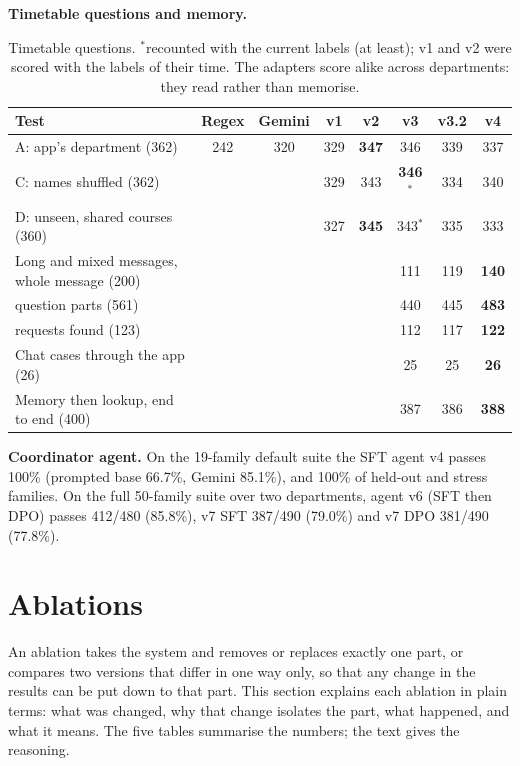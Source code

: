 \documentclass[11pt,a4paper]{article}
\newcommand{\best}[1]{\textbf{#1}}
\begin{document}
\textbf{Timetable questions and memory.}

\begin{table}[H]
\centering\small
\begin{tabularx}{\textwidth}{@{}Y c c c c c c c@{}}
\toprule
\textbf{Test} & \textbf{Regex} & \textbf{Gemini} & \textbf{v1} & \textbf{v2} & \textbf{v3} & \textbf{v3.2} & \textbf{v4}\\
\midrule
A: app's department (362) & 242 & 320 & 329 & \best{347} & 346 & 339 & 337\\
C: names shuffled (362) & & & 329 & 343 & \best{346}$^*$ & 334 & 340\\
D: unseen, shared courses (360) & & & 327 & \best{345} & 343$^*$ & 335 & 333\\
Long and mixed messages, whole message (200) & & & & & 111 & 119 & \best{140}\\
\quad question parts (561) & & & & & 440 & 445 & \best{483}\\
\quad requests found (123) & & & & & 112 & 117 & \best{122}\\
Chat cases through the app (26) & & & & & 25 & 25 & \best{26}\\
Memory then lookup, end to end (400) & & & & & 387 & 386 & \best{388}\\
\bottomrule
\end{tabularx}
\caption{Timetable questions. $^*$recounted with the current labels (at least); v1 and v2 were scored with the
labels of their time. The adapters score alike across departments: they read rather than memorise.}
\label{tab:lookup}
\end{table}

\textbf{Coordinator agent.} On the 19-family default suite the SFT agent v4 passes 100\% (prompted base 66.7\%,
Gemini 85.1\%), and 100\% of held-out and stress families. On the full 50-family suite over two departments,
agent v6 (SFT then DPO) passes 412/480 (85.8\%), v7 SFT 387/490 (79.0\%) and v7 DPO 381/490 (77.8\%).

\section{Ablations}
\label{sec:ablations}
An ablation takes the system and removes or replaces exactly one part, or compares two versions that differ in one
way only, so that any change in the results can be put down to that part. This section explains each ablation in
plain terms: what was changed, why that change isolates the part, what happened, and what it means. The five tables
summarise the numbers; the text gives the reasoning.
\end{document}
